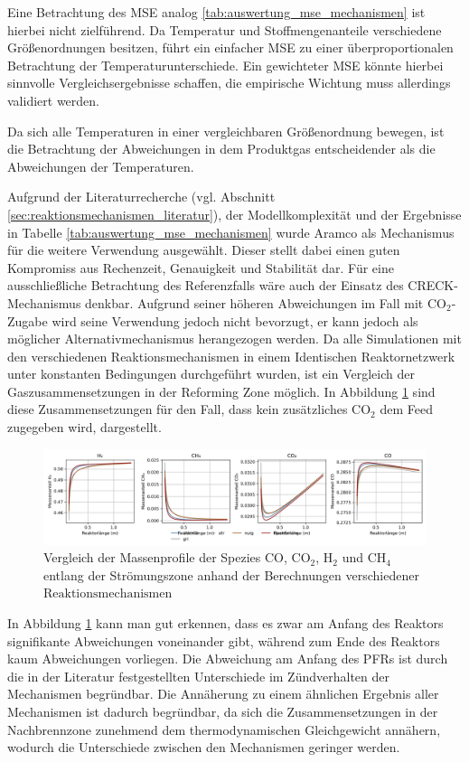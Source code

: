         Eine Betrachtung des MSE analog \ref{tab:auswertung_mse_mechanismen} ist hierbei nicht zielführend. Da Temperatur und Stoffmengenanteile verschiedene Größenordnungen besitzen, führt ein einfacher MSE zu einer überproportionalen Betrachtung der Temperaturunterschiede. Ein gewichteter MSE könnte hierbei sinnvolle Vergleichsergebnisse schaffen, die empirische Wichtung muss allerdings validiert werden.

        Da sich alle Temperaturen in einer vergleichbaren Größenordnung bewegen, ist die Betrachtung der Abweichungen in dem Produktgas entscheidender als die Abweichungen der Temperaturen. 

        Aufgrund der Literaturrecherche (vgl. Abschnitt \ref{sec:reaktionsmechanismen_literatur}), der Modellkomplexität und der Ergebnisse in Tabelle \ref{tab:auswertung_mse_mechanismen} wurde Aramco als Mechanismus für die weitere Verwendung ausgewählt. Dieser stellt dabei einen guten Kompromiss aus Rechenzeit, Genauigkeit und Stabilität dar. 
        Für eine ausschließliche Betrachtung des Referenzfalls wäre auch der Einsatz des CRECK-Mechanismus denkbar. Aufgrund seiner höheren Abweichungen im Fall mit CO$_2$-Zugabe wird seine Verwendung jedoch nicht bevorzugt, er kann jedoch als möglicher Alternativmechanismus herangezogen werden.
\iffalse
        Da alle Simulationen mit den verschiedenen Reaktionsmechanismen in einem Identischen Reaktornetzwerk unter konstanten Bedingungen durchgeführt wurden, ist ein Vergleich der Gaszusammensetzungen in der Reforming Zone möglich. In Abbildung \ref{fig:auswertung_verläufe_mechanismen_keinco2} sind diese Zusammensetzungen für den Fall, dass kein zusätzliches CO$_2$ dem Feed zugegeben wird, dargestellt. 
        \begin{figure}[H]
            \centering
            \includegraphics[width=1\linewidth]{img/Vergleich_mech/H2_CH4_CO_CO2_keinCO2.png}
            \caption{Vergleich der Massenprofile der Spezies CO, CO$_2$, H$_2$ und CH$_4$ entlang der Strömungszone anhand der Berechnungen verschiedener $\mbox{Reaktionsmechanismen}$}
            \label{fig:auswertung_verläufe_mechanismen_keinco2}
        \end{figure}
        In Abbildung \ref{fig:auswertung_verläufe_mechanismen_keinco2} kann man gut erkennen, dass es zwar am Anfang des Reaktors signifikante Abweichungen voneinander gibt, während zum Ende des Reaktors kaum Abweichungen vorliegen. Die Abweichung am Anfang des PFRs ist durch die in der Literatur festgestellten Unterschiede im Zündverhalten der Mechanismen begründbar. Die Annäherung zu einem ähnlichen Ergebnis aller Mechanismen ist dadurch begründbar, da sich die Zusammensetzungen in der Nachbrennzone zunehmend dem thermodynamischen Gleichgewicht annähern, wodurch die Unterschiede zwischen den Mechanismen geringer werden.


